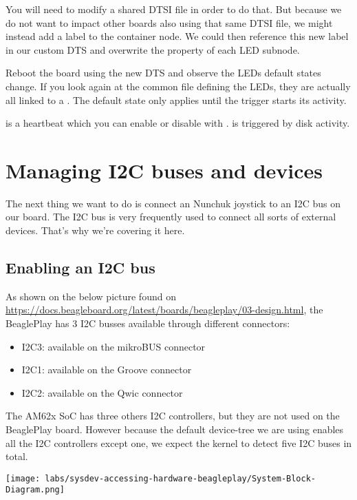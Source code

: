 You will need to modify a shared DTSI file in order to do that. But
because we do not want to impact other boards also using that same DTSI
file, we might instead add a label to the  container node. We
could then reference this new label in our custom DTS and overwrite the
 property of each LED subnode.

Reboot the board using the new DTS and observe the LEDs default states change.
If you look again at the common file defining the LEDs, they are actually all
linked to a . The default state only applies until
the trigger starts its activity.

 is a heartbeat which you can enable or disable with
.  is triggered by disk
activity.

\section{Managing I2C buses and devices}

The next thing we want to do is connect an Nunchuk joystick
to an I2C bus on our board. The I2C bus is very frequently used
to connect all sorts of external devices. That's why we're covering
it here.

\subsection{Enabling an I2C bus}

As shown on the below picture found on
\url{https://docs.beagleboard.org/latest/boards/beagleplay/03-design.html}, the
BeaglePlay has 3 I2C busses available through different connectors:

\begin{itemize}
\item I2C3: available on the mikroBUS connector
\item I2C1: available on the Groove connector
\item I2C2: available on the Qwic connector
\end{itemize}

The AM62x SoC has three others I2C controllers, but they are not used on the
BeaglePlay board. However because the default device-tree we are using enables
all the I2C controllers except one, we expect the kernel to detect five I2C
buses in total.

\texttt{[image: labs/sysdev-accessing-hardware-beagleplay/System-Block-Diagram.png]}

